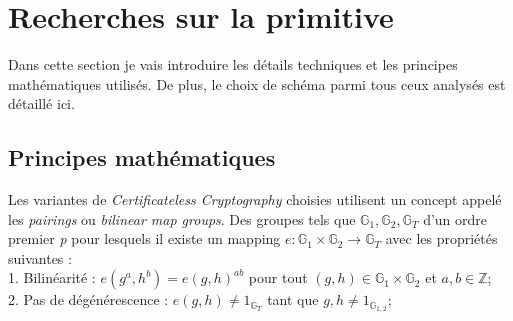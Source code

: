 \section{Recherches sur la primitive}
\label{sec:primitiveSearch}
Dans cette section je vais introduire les détails techniques et les principes mathématiques utilisés. De plus, le choix de schéma parmi tous ceux analysés est détaillé ici.
\subsection{Principes mathématiques}
Les variantes de \textit{Certificateless Cryptography} choisies utilisent un concept appelé les \textit{pairings} ou \textit{bilinear map groups}.
Des groupes tels que $\mathbb{G}_1, \mathbb{G}_2, \mathbb{G}_T$ d'un ordre premier \textit{p} pour lesquels il existe un mapping $e : \mathbb{G}_1 \times \mathbb{G}_2 \rightarrow \mathbb{G}_T$ avec les propriétés suivantes :\\
1. Bilinéarité : $e(g^a, h^b) = e(g, h)^{ab}$ pour tout $(g,h) \in \mathbb{G}_1 \times \mathbb{G}_2$ et $a,b \in \mathbb{Z}$;\\
2. Pas de dégénérescence : $e(g,h) \neq 1_{\mathbb{G}_T} $ tant que $g,h \neq 1_{\mathbb{G}_{1,2}}$;
